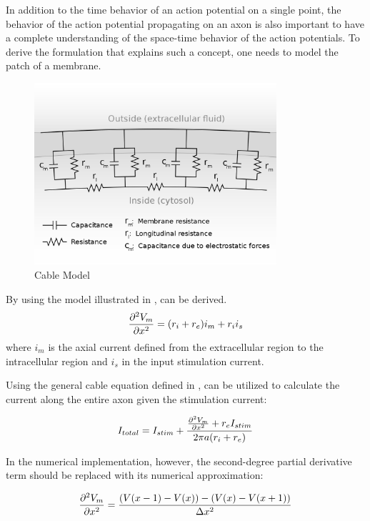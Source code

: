 \documentclass{IEEEtran}
\begin{document}
In addition to the time behavior of an action potential on a single point, the behavior of the action potential propagating on an axon is also important to have a complete understanding of the space-time behavior of the action potentials. To derive the formulation that explains such a concept, one needs to model the patch of a membrane.

\begin{figure}[h]
\centering
\includegraphics[width=0.8\textwidth]{1200px-Cable_theory_Neuron_RC_circuit_v3.svg.png}
\caption{Cable Model \cite{CableTheory}}\label{fig:approp}
\end{figure}

By using the model illustrated in ,  can be derived. 
\begin{equation}
    \pdv[2]{V_m}{x} = (r_i+r_e) i_m + r_i i_s \label{eqn:cable}
\end{equation}
where $i_m$ is the axial current defined from the extracellular region to the intracellular region and $i_s$ in the input stimulation current. 

Using the general cable equation defined in ,  can be utilized to calculate the current along the entire axon given the stimulation current: 

\begin{equation}
    I_{total} = I_{stim} + \frac{\pdv[2]{V_m}{x} + r_eI_{stim}}{2\pi a (r_i+r_e)} \label{eqn:num} 
\end{equation}

In the numerical implementation, however, the second-degree partial derivative term should be replaced with its numerical approximation: 

\begin{equation}
    \pdv[2]{V_m}{x} = \frac{(V(x-1)-V(x))-(V(x)-V(x+1))}{\Delta x^2}
    \label{eqn:current}
\end{equation}
\end{document}
